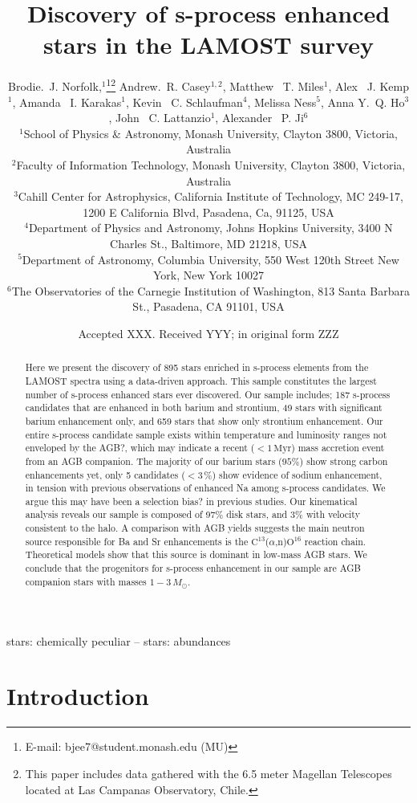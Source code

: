 \documentclass[a4paper,fleqn,usenatbib]{mnras}
\title[S-process stars in LAMOST]{Discovery of s-process enhanced stars in the LAMOST survey}
\author[Brodie.~J. Norfolk et al.]{Brodie.~J. Norfolk,$^{1}$\thanks{E-mail: bjee7@student.monash.edu (MU)}\thanks{This paper includes data gathered with the 6.5 meter Magellan Telescopes located at Las Campanas Observatory, Chile.}
Andrew.~R. Casey$^{1,2}$,
Matthew ~T. Miles$^{1}$,
Alex ~J. Kemp$^{1}$, \newauthor
Amanda ~I. Karakas$^{1}$,
Kevin ~C. Schlaufman$^{4}$,
Melissa Ness$^{5}$,
Anna Y.~Q. Ho$^{3}$, \newauthor
John ~C. Lattanzio$^{1}$, 
Alexander ~P. Ji$^{6}$
\\
$^{1}$School of Physics \& Astronomy, Monash University, Clayton 3800, Victoria, Australia\\
$^{2}$Faculty of Information Technology, Monash University, Clayton 3800, Victoria, Australia\\
$^{3}$Cahill Center for Astrophysics, California Institute of Technology, MC 249-17, 1200 E California Blvd, Pasadena, Ca, 91125, USA\\
$^{4}$Department of Physics and Astronomy, Johns Hopkins University, 3400 N Charles St., Baltimore, MD 21218, USA
\\
$^{5}$Department of Astronomy, Columbia University, 550 West 120th Street New York, New York 10027
\\
$^{6}$The Observatories of the Carnegie Institution of Washington, 813 Santa Barbara St., Pasadena, CA 91101, USA
}
\date{Accepted XXX. Received YYY; in original form ZZZ}
\begin{document}
\label{firstpage}
\pagerange{\pageref{firstpage}--\pageref{lastpage}}
\maketitle

\begin{abstract}

Here we present the discovery of 895 stars enriched in s-process elements from the LAMOST spectra using a data-driven approach. This sample constitutes the largest number of s-process enhanced stars ever discovered. Our sample includes; 187 s-process candidates that are enhanced in both barium and strontium, 49 stars with significant barium enhancement only, and 659 stars that show only strontium enhancement. Our entire s-process candidate sample exists within temperature and luminosity ranges not enveloped by the AGB?, which may indicate a recent ($<1\,\textrm{Myr}$) mass accretion event from an AGB companion. The majority of our barium stars ($95\%$) show strong carbon enhancements yet, only 5 candidates ($<3$\,\%) show evidence of sodium enhancement, in tension with previous observations of enhanced Na among s-process candidates. We argue this may have been a selection bias? in previous studies. Our kinematical analysis reveals our sample is composed of 97\% disk stars, and 3\% with velocity consistent to the halo. A comparison with AGB yields suggests the main neutron source responsible for Ba and Sr enhancements is the $\text{C}^{13}$(\textrm{$\alpha$},n)$\text{O}^{16}$ reaction chain. Theoretical models show that this source is dominant in low-mass AGB stars. We conclude that the progenitors for s-process enhancement in our sample are AGB companion stars with masses $1 - 3\,M_{\odot}$. 

\end{abstract}

\begin{keywords}
stars: chemically peculiar -- stars: abundances
\end{keywords}

\section{Introduction} \label{sec:intro}
\end{document}
